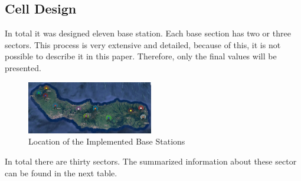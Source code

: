 \documentclass[letterpaper, 10 pt, conference]{ieeeconf}  %
\begin{document}
\subsection{Cell Design} \noindent
In total it was designed eleven base station. Each base section has two or three sectors. This process is very extensive and detailed, because of this, it is not possible to describe it in this paper. Therefore, only the final values will be presented. 
\begin{figure}[h]
    \centering
    \includegraphics[width=0.49\textwidth]{localizacaoBS.JPG}
    \caption{Location of the Implemented Base Stations}
    \label{fig:my_label}
\end{figure}
\par\noindent
In total there are thirty sectors. The summarized information about these sector can be found in the next table.
\end{document}
